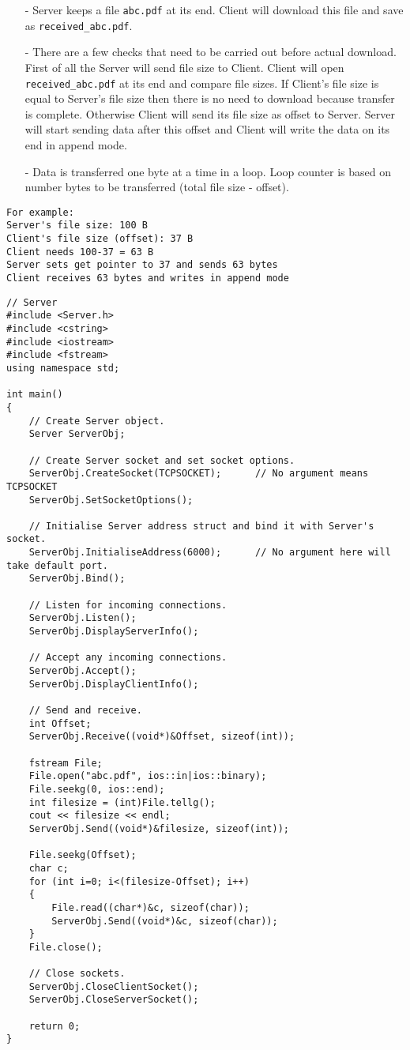 \documentclass[12pt,a4paper]{article}
\begin{document}
\begin{itemize}
\item[-] Server keeps a file \verb|abc.pdf| at its end. Client will download this file and save as \verb|received_abc.pdf|.
\item[-] There are a few checks that need to be carried out before actual download. First of all the Server will send file size to Client. Client will open \verb|received_abc.pdf| at its end and compare file sizes. If Client's file size is equal to Server's file size then there is no need to download because transfer is complete. Otherwise Client will send its file size as offset to Server. Server will start sending data after this offset and Client will write the data on its end in append mode.
\item[-] Data is transferred one byte at a time in a loop. Loop counter is based on number bytes to be transferred (total file size - offset).
\end{itemize}
\begin{verbatim}
For example:
Server's file size: 100 B
Client's file size (offset): 37 B
Client needs 100-37 = 63 B
Server sets get pointer to 37 and sends 63 bytes
Client receives 63 bytes and writes in append mode
\end{verbatim}
\begin{lstlisting}
// Server
#include <Server.h>
#include <cstring>
#include <iostream>
#include <fstream>
using namespace std;

int main()
{
	// Create Server object.
	Server ServerObj;

	// Create Server socket and set socket options.
	ServerObj.CreateSocket(TCPSOCKET);		// No argument means TCPSOCKET
	ServerObj.SetSocketOptions();

	// Initialise Server address struct and bind it with Server's socket.
	ServerObj.InitialiseAddress(6000);		// No argument here will take default port.
	ServerObj.Bind();

	// Listen for incoming connections.
	ServerObj.Listen();
	ServerObj.DisplayServerInfo();

	// Accept any incoming connections.
	ServerObj.Accept();
	ServerObj.DisplayClientInfo();

	// Send and receive.
	int Offset;
	ServerObj.Receive((void*)&Offset, sizeof(int));

	fstream File;
	File.open("abc.pdf", ios::in|ios::binary);
	File.seekg(0, ios::end);
	int filesize = (int)File.tellg();
	cout << filesize << endl;
	ServerObj.Send((void*)&filesize, sizeof(int));

	File.seekg(Offset);
	char c;
	for (int i=0; i<(filesize-Offset); i++)
	{
		File.read((char*)&c, sizeof(char));
		ServerObj.Send((void*)&c, sizeof(char));
	}
	File.close();

	// Close sockets.
	ServerObj.CloseClientSocket();
	ServerObj.CloseServerSocket();

	return 0;
}
\end{lstlisting}
\end{document}
